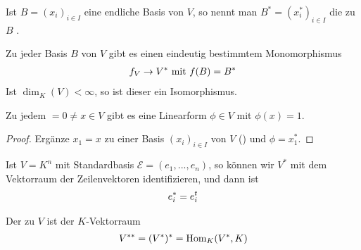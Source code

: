 \begin{definition}
	Ist $B=(x_i)_{i\in I}$ eine endliche Basis von $V$, so nennt man $B^*=(x_i^*)_{i\in I}$ die zu $B$ .
\end{definition}

\begin{conclusion}
	Zu jeder Basis $B$ von $V$ gibt es einen eindeutig bestimmtem Monomorphismus
	\begin{align}
		f_V\to V^*\text{ mit } f(B)=B^*\notag
	\end{align}
	Ist $\dim_K(V)<\infty$, so ist dieser ein Isomorphismus.
\end{conclusion}

\begin{conclusion}
	Zu jedem $=0\neq x\in V$ gibt es eine Linearform $\phi\in V$ mit $\phi(x)=1$.
\end{conclusion}
\begin{proof}
	Ergänze $x_1=x$ zu einer Basis $(x_i)_{i\in I}$ von $V$ () und $\phi=x_1^*$.
\end{proof}

\begin{example}
	Ist $V=K^n$ mit Standardbasis $\mathcal{E}=(e_1,...,e_n)$, so können wir $V^*$ mit dem Vektorraum der Zeilenvektoren identifizieren, und dann ist
	\begin{align}
		e_i^* = e_i^t\notag
	\end{align}
\end{example}

\begin{definition}[Bidualraum]
	Der  zu $V$ ist der $K$-Vektorraum
	\begin{align}
		V^{**}=(V^*)^*=\operatorname{Hom}_K(V^*,K)\notag
	\end{align}
\end{definition}

